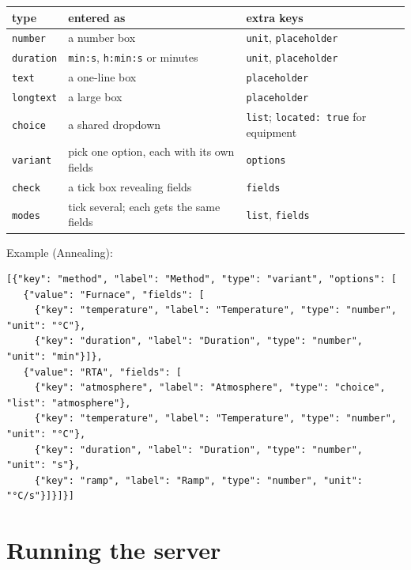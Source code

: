\documentclass[11pt,a4paper]{article}
\begin{document}
\begin{center}
\small
\begin{tabularx}{\linewidth}{@{}l>{\raggedright}p{4cm}X@{}}
\toprule
\textbf{type} & \textbf{entered as} & \textbf{extra keys} \\
\midrule
\texttt{number}   & a number box & \texttt{unit}, \texttt{placeholder} \\
\texttt{duration} & \texttt{min:s}, \texttt{h:min:s} or minutes & \texttt{unit}, \texttt{placeholder} \\
\texttt{text}     & a one-line box & \texttt{placeholder} \\
\texttt{longtext} & a large box & \texttt{placeholder} \\
\texttt{choice}   & a shared dropdown & \texttt{list}; \texttt{located: true} for equipment \\
\texttt{variant}  & pick one option, each with its own fields & \texttt{options} \\
\texttt{check}    & a tick box revealing fields & \texttt{fields} \\
\texttt{modes}    & tick several; each gets the same fields & \texttt{list}, \texttt{fields} \\
\bottomrule
\end{tabularx}
\end{center}

Example (Annealing):

\begin{tcolorbox}[colback=gray!5,colframe=gray!40,boxrule=0.4pt,arc=1pt]
\footnotesize
\begin{verbatim}
[{"key": "method", "label": "Method", "type": "variant", "options": [
   {"value": "Furnace", "fields": [
     {"key": "temperature", "label": "Temperature", "type": "number", "unit": "°C"},
     {"key": "duration", "label": "Duration", "type": "number", "unit": "min"}]},
   {"value": "RTA", "fields": [
     {"key": "atmosphere", "label": "Atmosphere", "type": "choice", "list": "atmosphere"},
     {"key": "temperature", "label": "Temperature", "type": "number", "unit": "°C"},
     {"key": "duration", "label": "Duration", "type": "number", "unit": "s"},
     {"key": "ramp", "label": "Ramp", "type": "number", "unit": "°C/s"}]}]}]
\end{verbatim}
\end{tcolorbox}

\section{Running the server}
\label{sec:install}
\end{document}
